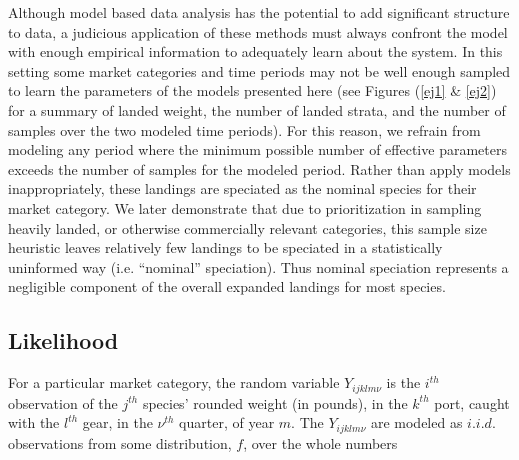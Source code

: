 \documentclass[12pt]{article}
\begin{document}
%
Although model based data analysis has the potential to add significant
structure to data, a judicious application of these methods must always
confront the model with enough empirical information to adequately learn
about the system. In this setting some market categories and time
periods may not be well enough sampled to learn the parameters of the
models presented here (see Figures (\ref{ej1} \& \ref{ej2}) for a summary of 
landed weight, the number of landed strata, and the number of samples over the 
two modeled time periods). For this reason, we refrain from modeling any 
period where the minimum possible number of effective parameters exceeds the 
number of samples for the modeled period. Rather than apply models 
inappropriately, these landings are speciated as the nominal species for their 
market category. We later demonstrate that due to prioritization in sampling 
heavily landed, or otherwise commercially relevant categories, this sample 
size heuristic leaves relatively few landings to be speciated in a 
statistically uninformed way (i.e.  ``nominal'' speciation). Thus nominal 
speciation represents a negligible component of the overall expanded landings 
for most species.



%
%
\subsection{Likelihood}
%
%

%
For a particular market category, the random variable \(Y_{ijklm\nu}\) is the 
\(i^{th}\) observation of the \(j^{th}\) species' rounded weight (in pounds), 
in the \(k^{th}\) port, caught with the \(l^{th}\) gear, in the \(\nu^{th}\) 
quarter, of year \(m\). The \(Y_{ijklm\nu}\) are modeled as $i.i.d.$ 
observations from some distribution, $f$, over the whole numbers
\end{document}
